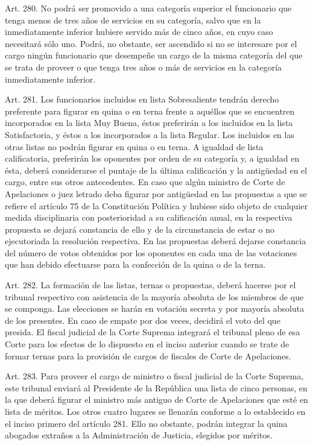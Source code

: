     Art. 280. No podrá ser promovido a una categoría superior el funcionario que tenga menos de tres años de servicios en su categoría, salvo que en la inmediatamente inferior hubiere servido más de cinco años, en cuyo caso necesitará sólo uno. Podrá, no obstante, ser ascendido si no se interesare por el cargo ningún funcionario que desempeñe un cargo de la misma categoría del que se trata de proveer o que tenga tres años o más de servicios en la categoría inmediatamente inferior.


    Art. 281. Los funcionarios incluidos en lista Sobresaliente tendrán derecho preferente para figurar en quina o en terna frente a aquéllos que se encuentren incorporados en la lista Muy Buena, éstos preferirán a los incluidos en la lista Satisfactoria, y éstos a los incorporados a la lista Regular. Los incluidos en las otras listas no podrán figurar en quina o en terna. A igualdad de lista calificatoria, preferirán los oponentes por orden de su categoría y, a igualdad en ésta, deberá considerarse el puntaje de la última calificación y la antigüedad en el cargo, entre sus otros antecedentes.
    En caso que algún ministro de Corte de Apelaciones o juez letrado deba figurar por antigüedad en las propuestas a que se refiere el artículo 75 de la Constitución Política y hubiese sido objeto de cualquier medida disciplinaria con posterioridad a su calificación anual, en la respectiva propuesta se dejará constancia de ello y de la circunstancia de estar o no ejecutoriada la resolución respectiva.
    En las propuestas deberá dejarse constancia del número de votos obtenidos por los oponentes en cada una de las votaciones que han debido efectuarse para la confección de la quina o de la terna.


    Art. 282. La formación de las listas, ternas o propuestas, deberá hacerse por el tribunal respectivo con asistencia de la mayoría absoluta de los miembros de que se componga. Las elecciones se harán en votación secreta y por mayoría absoluta de los presentes. En caso de empate por dos veces, decidirá el voto del que presida.
    El fiscal judicial de la Corte Suprema integrará el tribunal pleno de esa Corte para los efectos de lo dispuesto en el inciso anterior cuando se trate de formar ternas para la provisión de cargos de fiscales de Corte de Apelaciones.



    Art. 283. Para proveer el cargo de ministro o fiscal judicial de la Corte Suprema, este tribunal enviará al Presidente de la República una lista de cinco personas, en la que deberá figurar el ministro más antiguo de Corte de Apelaciones que esté en lista de méritos. Los otros cuatro lugares se llenarán conforme a lo establecido en el inciso primero del artículo 281. Ello no obstante, podrán integrar la quina abogados extraños a la Administración de Justicia, elegidos por méritos.



